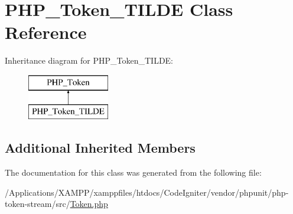 \hypertarget{class_p_h_p___token___t_i_l_d_e}{}\section{P\+H\+P\+\_\+\+Token\+\_\+\+T\+I\+L\+DE Class Reference}
\label{class_p_h_p___token___t_i_l_d_e}
Inheritance diagram for P\+H\+P\+\_\+\+Token\+\_\+\+T\+I\+L\+DE\+:\begin{figure}[H]
\begin{center}
\leavevmode
\includegraphics[height=2.000000cm]{class_p_h_p___token___t_i_l_d_e}
\end{center}
\end{figure}
\subsection*{Additional Inherited Members}


The documentation for this class was generated from the following file\+:\begin{DoxyCompactItemize}
\item 
/\+Applications/\+X\+A\+M\+P\+P/xamppfiles/htdocs/\+Code\+Igniter/vendor/phpunit/php-\/token-\/stream/src/\mbox{\hyperlink{_token_8php}{Token.\+php}}\end{DoxyCompactItemize}
